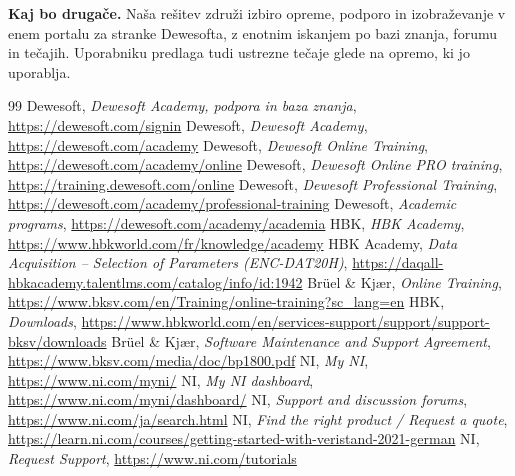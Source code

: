 \documentclass[a4paper,11pt]{article}
\begin{document}
\textbf{Kaj bo drugače.} Naša rešitev združi izbiro opreme, podporo in izobraževanje v enem portalu za stranke Dewesofta, z enotnim iskanjem po bazi znanja, forumu in tečajih. Uporabniku predlaga tudi ustrezne tečaje glede na opremo, ki jo uporablja.

\begin{thebibliography}{99}
 Dewesoft, \textit{Dewesoft Academy, podpora in baza znanja}, \url{https://dewesoft.com/signin}
 Dewesoft, \textit{Dewesoft Academy}, \url{https://dewesoft.com/academy}
 Dewesoft, \textit{Dewesoft Online Training}, \url{https://dewesoft.com/academy/online}
 Dewesoft, \textit{Dewesoft Online PRO training}, \url{https://training.dewesoft.com/online}
 Dewesoft, \textit{Dewesoft Professional Training}, \url{https://dewesoft.com/academy/professional-training}
 Dewesoft, \textit{Academic programs}, \url{https://dewesoft.com/academy/academia}
 HBK, \textit{HBK Academy}, \url{https://www.hbkworld.com/fr/knowledge/academy}
 HBK Academy, \textit{Data Acquisition -- Selection of Parameters (ENC-DAT20H)}, \url{https://daqall-hbkacademy.talentlms.com/catalog/info/id:1942}
 Brüel \& Kjær, \textit{Online Training}, \url{https://www.bksv.com/en/Training/online-training?sc_lang=en}
 HBK, \textit{Downloads}, \url{https://www.hbkworld.com/en/services-support/support/support-bksv/downloads}
 Brüel \& Kjær, \textit{Software Maintenance and Support Agreement}, \url{https://www.bksv.com/media/doc/bp1800.pdf}
 NI, \textit{My NI}, \url{https://www.ni.com/myni/}
 NI, \textit{My NI dashboard}, \url{https://www.ni.com/myni/dashboard/}
 NI, \textit{Support and discussion forums}, \url{https://www.ni.com/ja/search.html}
 NI, \textit{Find the right product / Request a quote}, \url{https://learn.ni.com/courses/getting-started-with-veristand-2021-german}
 NI, \textit{Request Support}, \url{https://www.ni.com/tutorials}
\end{thebibliography}
\end{document}
